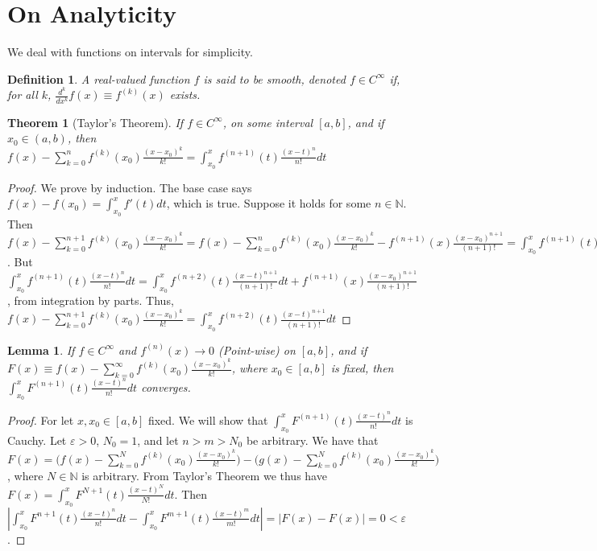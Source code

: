 \documentclass[crop=false,class=book]{standalone}
\theoremstyle{mystyle}
\newtheorem{theorem}{Theorem}[section]
\newtheorem{definition}{Definition}[section]
\newtheorem{lemma}{Lemma}[section]
\begin{document}
\section{On Analyticity}
We deal with functions on intervals for simplicity.
\begin{definition}
A real-valued function $f$ is said to be smooth, denoted $f\in C^{\infty}$ if, for all $k$, $\frac{d^k}{dx^k}f(x) \equiv f^{(k)}(x)$ exists.
\end{definition}
\begin{theorem}[Taylor's Theorem]
If $f\in C^{\infty}$, on some interval $[a,b]$, and if $x_0\in (a,b)$, then $f(x) - \sum_{k=0}^{n} f^{(k)}(x_0)\frac{(x-x_0)^k}{k!} = \int_{x_0}^{x} f^{(n+1)}(t)\frac{(x-t)^n}{n!}dt$
\end{theorem}
\begin{proof}
We prove by induction. The base case says $f(x)-f(x_0) = \int_{x_0}^{x} f'(t)dt$, which is true. Suppose it holds for some $n\in \mathbb{N}$. Then $f(x)-\sum_{k=0}^{n+1} f^{(k)}(x_0)\frac{(x-x_0)^k}{k!} = f(x)-\sum_{k=0}^{n} f^{(k)}(x_0)\frac{(x-x_0)^k}{k!} - f^{(n+1)}(x)\frac{(x-x_0)^{n+1}}{(n+1)!} = \int_{x_0}^{x} f^{(n+1)}(t)\frac{(x-t)^n}{n!}dt - f^{(n+1)}(x)\frac{(x-x_0)^{n+1}}{(n+1)!}$. But $\int_{x_0}^{x} f^{(n+1)}(t)\frac{(x-t)^n}{n!}dt =  \int_{x_0}^{x} f^{(n+2)}(t) \frac{(x-t)^{n+1}}{(n+1)!} dt + f^{(n+1)}(x)\frac{(x-x_0)^{n+1}}{(n+1)!}$, from integration by parts. Thus, $f(x)-\sum_{k=0}^{n+1} f^{(k)}(x_0)\frac{(x-x_0)^k}{k!}= \int_{x_0}^{x} f^{(n+2)}(t) \frac{(x-t)^{n+1}}{(n+1)!} dt$
\end{proof}
\begin{lemma}
If $f\in C^{\infty}$ and $f^{(n)}(x)\rightarrow 0$ (Point-wise) on $[a,b]$, and if $F(x) \equiv f(x)-\sum_{k=0}^{\infty} f^{(k)}(x_0)\frac{(x-x_0)^{k}}{k!}$, where $x_0\in [a,b]$ is fixed, then $\int_{x_0}^{x} F^{(n+1)}(t)\frac{(x-t)^{n}}{n!}dt$ converges. 
\end{lemma}
\begin{proof}
For let $x,x_0\in [a,b]$ fixed. We will show that $\int_{x_0}^{x} F^{(n+1)}(t)\frac{(x-t)^{n}}{n!}dt$ is Cauchy. Let $\varepsilon>0$, $N_0 = 1$, and let $n>m>N_0$ be arbitrary. We have that $F(x) = \bigg(f(x)-\sum_{k=0}^{N} f^{(k)}(x_0)\frac{(x-x_0)^{k}}{k!}\bigg)-\bigg(g(x)-\sum_{k=0}^{N} f^{(k)}(x_0)\frac{(x-x_0)^{k}}{k!}\bigg)$, where $N\in \mathbb{N}$ is arbitrary. From Taylor's Theorem we thus have $F(x) = \int_{x_0}^{x}F^{N+1}(t)\frac{(x-t)^N}{N!}dt$. Then $|\int_{x_0}^{x}F^{n+1}(t)\frac{(x-t)^n}{n!}dt-\int_{x_0}^{x}F^{m+1}(t)\frac{(x-t)^m}{m!}dt| = |F(x)-F(x)|= 0 <\varepsilon$. 
\end{proof}
\end{document}
